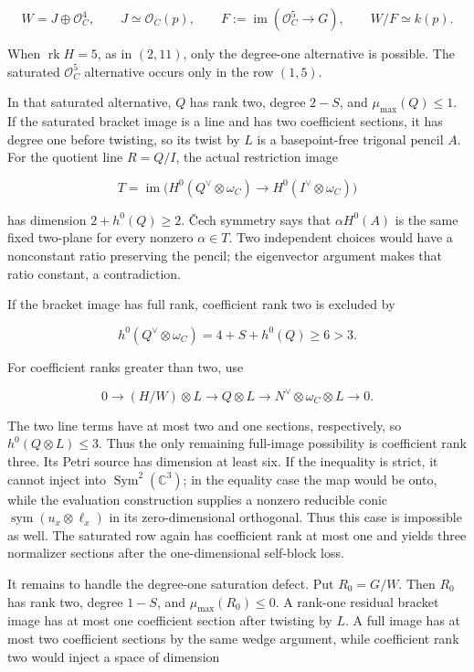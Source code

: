 \documentclass[11pt]{article}
\theoremstyle{definition}
\begin{document}
\[W=J\oplus\mathcal O_C^4,\qquad J\simeq\mathcal O_C(p),
\qquad F:=\operatorname{im}(\mathcal O_C^5\to G),
\qquad W/F\simeq k(p).\]

When \(\operatorname{rk}H=5\), as in \((2,11)\), only the degree-one
alternative is possible. The saturated \(\mathcal O_C^5\) alternative
occurs only in the row \((1,5)\).

In that saturated alternative, \(Q\) has rank two, degree \(2-S\), and
\(\mu_{\max}(Q)\le1\). If the saturated bracket image is a line and has
two coefficient sections, it has degree one before twisting, so its
twist by \(L\) is a basepoint-free trigonal pencil \(A\). For the
quotient line \(R=Q/I\), the actual restriction image

\[T=\operatorname{im}\bigl(
H^0(Q^\vee\otimes\omega_C)\longrightarrow
H^0(I^\vee\otimes\omega_C)\bigr)\]

has dimension \(2+h^0(Q)\ge2\). \v{C}ech symmetry says that
\(\alpha H^0(A)\) is the same fixed two-plane for every nonzero
\(\alpha\in T\). Two independent choices would have a nonconstant ratio
preserving the pencil; the eigenvector argument makes that ratio
constant, a contradiction.

If the bracket image has full rank, coefficient rank two is excluded by

\[h^0(Q^\vee\otimes\omega_C)=4+S+h^0(Q)\ge6>3.\]

For coefficient ranks greater than two, use

\[0\longrightarrow (H/W)\otimes L\longrightarrow Q\otimes L
\longrightarrow N^\vee\otimes\omega_C\otimes L\longrightarrow0.\]

The two line terms have at most two and one sections, respectively, so
\(h^0(Q\otimes L)\le3\). Thus the only remaining full-image possibility
is coefficient rank three. Its Petri source has dimension at least six.
If the inequality is strict, it cannot inject into
\(\operatorname{Sym}^2(\mathbb C^3)\); in the equality case the map
would be onto, while the evaluation construction supplies a nonzero
reducible conic \(\operatorname{sym}(u_x\otimes\ell_x)\) in its
zero-dimensional orthogonal. Thus this case is impossible as well. The
saturated row again has coefficient rank at most one and yields three
normalizer sections after the one-dimensional self-block loss.

It remains to handle the degree-one saturation defect. Put \(R_0=G/W\).
Then \(R_0\) has rank two, degree \(1-S\), and \(\mu_{\max}(R_0)\le0\).
A rank-one residual bracket image has at most one coefficient section
after twisting by \(L\). A full image has at most two coefficient
sections by the same wedge argument, while coefficient rank two would
inject a space of dimension
\end{document}
